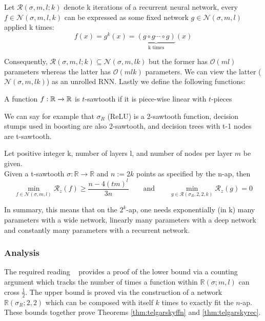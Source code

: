 \documentclass{article}
\begin{document}
Let $\mathscr{R}(\sigma, m, l; k)$ denote k iterations of a recurrent neural network, every $f \in \mathscr{N}(\sigma, m, l, k)$ can be expressed as some fixed network $g \in \mathscr{N}(\sigma, m, l)$ applied k times:
$$f(x) = g^k(x) = \underbrace{(g\circ g \cdots \circ g)}_\text{k times}(x)$$

Consequently, $\mathscr{R}(\sigma, m, l; k) \subseteq \mathscr{N}(\sigma, m, lk)$ but the former has $\mathcal{O}(ml)$ parameters whereas the latter has $\mathcal{O}(mlk)$ parameters. We can view the latter ($\mathscr{N}(\sigma, m, lk)$) as an unrolled RNN. Lastly we define the following functions:

\begin{defn}[Sawtooth]
A function $f: \mathbb{R} \xrightarrow{} \mathbb{R}$ is $t$-sawtooth if it is piece-wise linear with $t$-pieces
\end{defn}
We can say for example that $\sigma_R$ (ReLU) is a 2-sawtooth function, decision stumps used in boosting are also 2-sawtooth, and decision trees with t-1 nodes are t-sawtooth.

\begin{thm}
\label{thm:telgarskyrec}
Let positive integer k, number of layers l, and number of nodes per layer $m$ be given. \\
Given a t-sawtooth $\sigma : \mathbb{R} \to \mathbb{R}$ and $n := 2k$ points as specified by the n-ap, then \\
$$\min_{f\in\mathscr{N}(\sigma, m, l)} \mathcal{R}_z(f) \geq \frac{n-4(tm)^l}{3n} \quad \quad \text{and} \quad \quad \min_{g\in\mathscr{R}(\sigma_R, 2, 2, k)} \mathcal{R}_z(g) = 0$$
\end{thm}
In summary, this means that on the $2^k$-ap, one needs exponentially (in k) many parameters with a wide network, linearly many parameters with a deep network and constantly many parameters with a recurrent network.

\subsubsection{Analysis}
The required reading ~\citep{telgarsky2015representation} provides a proof of the lower bound via a counting argument which tracks the number of times a function within $\mathbb{R}(\sigma;m,l)$ can cross $\frac{1}{2}$. The upper bound is proved via the construction of a network $\mathbb{R}(\sigma_R; 2, 2)$ which can be composed with itself $k$ times to exactly fit the $n$-ap. These bounds together prove Theorems \ref{thm:telgarskyffn} and \ref{thm:telgarskyrec}.\\
\end{document}
